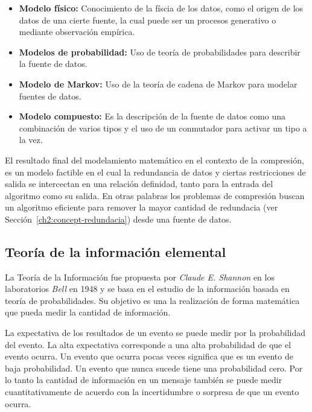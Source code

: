 \begin{itemize}
	\menorEspacioItemize
	\item \textbf{Modelo físico:} Conocimiento de la físcia de los datos, como el origen de los datos de una cierte fuente, la cual puede ser un procesos generativo o mediante observación empírica.

	\item \textbf{Modelos de probabilidad:} Uso de teoría de probabilidades para describir la fuente de datos.


	\item \textbf{Modelo de Markov:} Uso de la teoría de cadena de Markov para modelar fuentes de datos.


	\item \textbf{Modelo compuesto:} Es la descripción de la fuente de datos como una combinación de varios tipos y el uso de un conmutador para activar un tipo a la vez.
\end{itemize}

El resultado final del modelamiento matemático en el contexto de la compresión, es un modelo factible en el cual la redundancia de datos y ciertas restricciones de salida se intercectan en una relación definidad, tanto para la entrada del algoritmo como su salida. En otras palabras los problemas de compresión  buscan un algoritmo eficiente para remover la mayor cantidad de redundacia (ver Sección~\ref{ch2:concept-redundacia}) desde una fuente de datos.

\uncm
 




\subsection{Teoría de la información elemental}


La Teoría de la Información fue propuesta por \emph{Claude E. Shannon} en los laboratorios \emph{Bell} en 1948 y se basa en el estudio de la información basada en teoría de probabilidades. Su objetivo es una la realización de forma matemática que pueda medir la cantidad de información.

La expectativa de los resultados de un evento se puede medir por la probabilidad del evento. La alta expectativa corresponde a una alta probabilidad de que el evento ocurra. Un evento que ocurra pocas veces significa que es un evento de baja probabilidad. Un evento que nunca sucede tiene una probabilidad cero. Por lo tanto la cantidad de información en un mensaje también se puede medir cuantitativamente de acuerdo con la incertidumbre o sorpresa de que un evento ocurra.





